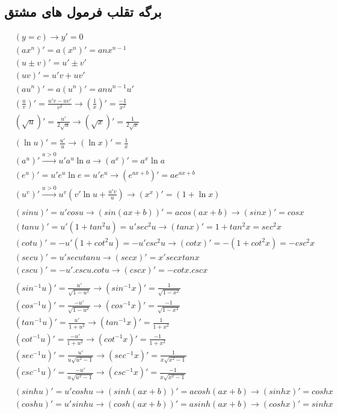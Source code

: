 \newpage
\subsection{برگه تقلب فرمول های مشتق}
\begin{align*}
&(y = c) \longrightarrow y' = 0 \\
&(ax^n)' = a(x^n)' = anx^{n-1} \\
&(u \pm v)' = u' \pm v' \\
&(uv)' = u'v + uv' \\
&(au^n)' = a(u^n)' = anu^{n-1}u' \\
&(\frac{u}{v})' = \frac{u'v - uv'}{v^2} \longrightarrow (\frac{1}{x})' = \frac{-1}{x^2} \\
&(\sqrt{u})' = \frac{u'}{2\sqrt{u}} \longrightarrow (\sqrt{x})' = \frac{1}{2\sqrt{x}} \\
\\
&(\ln u)' = \frac{u'}{u} \longrightarrow (\ln x)' = \frac{1}{x}  \\
&(a^u)' \overset{a>0}{\longrightarrow} u'a^u\ln a \longrightarrow (a^x)' = a^x\ln a \\
&(e^u)' = u'e^u\ln e = u'e^u \longrightarrow (e^{ax+b})' = ae^{ax+b} \\
&(u^v)' \overset{u>0}{\longrightarrow} u^v(v'\ln u+\frac{u'v}{u}) \longrightarrow (x^x)' = (1 + \ln x) \\
\\
&(sin u)' = u'cos u \longrightarrow (sin(ax+b))' = a cos(ax+b) \longrightarrow (sin x)' = cos x \\
&(tan u)' = u'(1+tan^2u) = u'sec^2u \longrightarrow (tan x)' = 1+tan^2 x = sec^2 x \\
&(cot u)' = -u'(1+cot^2u) = -u'csc^2u \longrightarrow (cot x)' = -(1+cot^2x) = -csc^2x \\
&(sec u)' = u'sec u tan u \longrightarrow (sec x)' = x'sec xtan x \\
&(csc u)' = -u'.csc u.cot u \longrightarrow (csc x)' = -cot x.csc x \\
\\
&(sin^{-1} u)' = \frac{u'}{\sqrt{1-u^2}} \longrightarrow (sin^{-1}x)' = \frac{1}{\sqrt{1-x^2}} \\
&(cos^{-1} u)' = \frac{-u'}{\sqrt{1-u^2}} \longrightarrow (cos^{-1}x)' = \frac{-1}{\sqrt{1-x^2}} \\
&(tan^{-1} u)' = \frac{u'}{1+u^2} \longrightarrow (tan^{-1}x)' = \frac{1}{1+x^2} \\
&(cot^{-1} u)' = \frac{-u'}{1+u^2} \longrightarrow (cot^{-1}x)' = \frac{-1}{1+x^2} \\
&(sec^{-1}u)' = \frac{u'}{u\sqrt{u^2-1}} \longrightarrow (sec^{-1}x)' = \frac{1}{x\sqrt{x^2-1}} \\
&(csc^{-1}u)' = \frac{-u'}{u\sqrt{u^2-1}} \longrightarrow (csc^{-1}x)' = \frac{-1}{x\sqrt{x^2-1}} \\
\\
&(sinh u)' = u'cosh u \longrightarrow (sinh(ax+b))' = acosh(ax+b) \longrightarrow (sinh x)' = cosh x \\
&(cosh u)' = u'sinh u \longrightarrow (cosh(ax+b))' = asinh(ax+b) \longrightarrow (cosh x)' = sinh x  \\
\end{align*}
